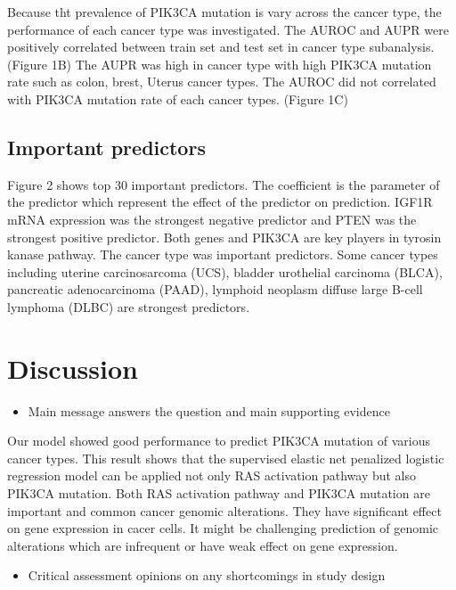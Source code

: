 \documentclass[10pt,letterpaper]{article}
\providecommand{\tightlist}{%
  \setlength{\itemsep}{0pt}\setlength{\parskip}{0pt}}
\begin{document}
Because tht prevalence of PIK3CA mutation is vary across the cancer
type, the performance of each cancer type was investigated. The AUROC
and AUPR were positively correlated between train set and test set in
cancer type subanalysis. (Figure 1B) The AUPR was high in cancer type
with high PIK3CA mutation rate such as colon, brest, Uterus cancer
types. The AUROC did not correlated with PIK3CA mutation rate of each
cancer types. (Figure 1C)

\hypertarget{important-predictors}{%
\subsection{Important predictors}\label{important-predictors}}

Figure 2 shows top 30 important predictors. The coefficient is the
parameter of the predictor which represent the effect of the predictor
on prediction. IGF1R mRNA expression was the strongest negative
predictor and PTEN was the strongest positive predictor. Both genes and
PIK3CA are key players in tyrosin kanase pathway. The cancer type was
important predictors. Some cancer types including uterine carcinosarcoma
(UCS), bladder urothelial carcinoma (BLCA), pancreatic adenocarcinoma
(PAAD), lymphoid neoplasm diffuse large B-cell lymphoma (DLBC) are
strongest predictors.

\hypertarget{discussion}{%
\section{Discussion}\label{discussion}}

\begin{itemize}
\tightlist
\item
  Main message answers the question and main supporting evidence
\end{itemize}

Our model showed good performance to predict PIK3CA mutation of various
cancer types. This result shows that the supervised elastic net
penalized logistic regression model can be applied not only RAS
activation pathway but also PIK3CA mutation. Both RAS activation pathway
and PIK3CA mutation are important and common cancer genomic alterations.
They have significant effect on gene expression in cacer cells. It might
be challenging prediction of genomic alterations which are infrequent or
have weak effect on gene expression.

\begin{itemize}
\tightlist
\item
  Critical assessment opinions on any shortcomings in study design
\end{itemize}
\end{document}
